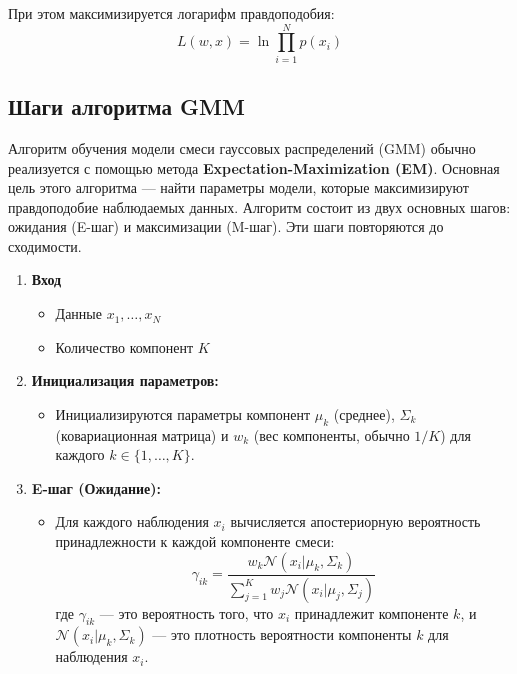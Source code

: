При этом максимизируется логарифм правдоподобия:
\[
L(w, x) = \ln \prod_{i=1}^N p(x_i)
\]


\subsection{Шаги алгоритма GMM}

Алгоритм обучения модели смеси гауссовых распределений (GMM) обычно реализуется с помощью метода \textbf{Expectation-Maximization (EM)}. Основная цель этого алгоритма — найти параметры модели, которые максимизируют правдоподобие наблюдаемых данных. Алгоритм состоит из двух основных шагов: ожидания (E-шаг) и максимизации (M-шаг). Эти шаги повторяются до сходимости.

\begin{enumerate}
    \item \textbf{Вход}
    \begin{itemize}
        \item Данные $x_1, \ldots, x_N$
        \item Количество компонент $K$
    \end{itemize}
    \item \textbf{Инициализация параметров:}
    \begin{itemize}
        \item Инициализируются параметры компонент $\mu_k$ (среднее), $\Sigma_k$ (ковариационная матрица) и $w_k$ (вес компоненты, обычно $1/ K$) для каждого $k \in \{1, \dots, K\}$.
    \end{itemize}

    \item \textbf{E-шаг (Ожидание):}
    \begin{itemize}
        \item Для каждого наблюдения $x_i$ вычисляется апостериорную вероятность принадлежности к каждой компоненте смеси:
        \[
        \gamma_{ik} = \frac{w_k \mathcal{N}(x_i | \mu_k, \Sigma_k)}{\sum_{j=1}^{K} w_j \mathcal{N}(x_i | \mu_j, \Sigma_j)}
        \]
        где $\gamma_{ik}$ — это вероятность того, что $x_i$ принадлежит компоненте $k$, и $\mathcal{N}(x_i | \mu_k, \Sigma_k)$ — это плотность вероятности компоненты $k$ для наблюдения $x_i$.
    \end{itemize}


\end{enumerate}
